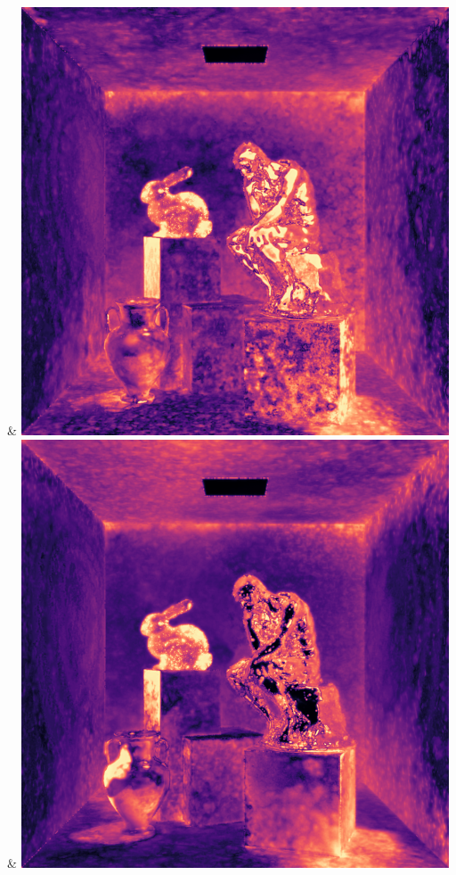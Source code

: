 & \includegraphics[width=\linewidth]{figures/py/tests/batch_size/100+nrc+pt+16@4_1spp_flip.png}
& \includegraphics[width=\linewidth]{figures/py/tests/batch_size/500+nrc+pt+16@4_1spp_flip.png}

